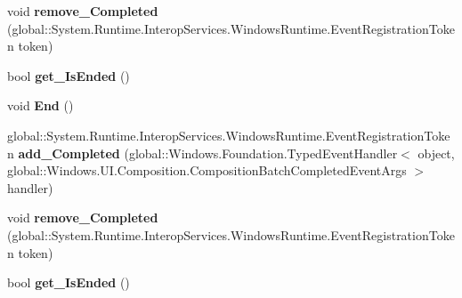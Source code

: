 \begin{DoxyCompactItemize}
\item 
\mbox{\label{interface_windows_1_1_u_i_1_1_composition_1_1_i_composition_scoped_batch_af4baa58c0bffd46f656f3fd7c4b1fdca}} 
void {\bfseries remove\+\_\+\+Completed} (global\+::\+System.\+Runtime.\+Interop\+Services.\+Windows\+Runtime.\+Event\+Registration\+Token token)
\item 
\mbox{\label{interface_windows_1_1_u_i_1_1_composition_1_1_i_composition_scoped_batch_a69a6c393c83900c6a83bce1ebc34c667}} 
bool {\bfseries get\+\_\+\+Is\+Ended} ()
\item 
\mbox{\label{interface_windows_1_1_u_i_1_1_composition_1_1_i_composition_scoped_batch_a6a716664cb94b74043a3dfc0119abd68}} 
void {\bfseries End} ()
\item 
\mbox{\label{interface_windows_1_1_u_i_1_1_composition_1_1_i_composition_scoped_batch_a8e6184255ede7485bdb1fd90fdc9b59c}} 
global\+::\+System.\+Runtime.\+Interop\+Services.\+Windows\+Runtime.\+Event\+Registration\+Token {\bfseries add\+\_\+\+Completed} (global\+::\+Windows.\+Foundation.\+Typed\+Event\+Handler$<$ object, global\+::\+Windows.\+U\+I.\+Composition.\+Composition\+Batch\+Completed\+Event\+Args $>$ handler)
\item 
\mbox{\label{interface_windows_1_1_u_i_1_1_composition_1_1_i_composition_scoped_batch_af4baa58c0bffd46f656f3fd7c4b1fdca}} 
void {\bfseries remove\+\_\+\+Completed} (global\+::\+System.\+Runtime.\+Interop\+Services.\+Windows\+Runtime.\+Event\+Registration\+Token token)
\item 
\mbox{\label{interface_windows_1_1_u_i_1_1_composition_1_1_i_composition_scoped_batch_a69a6c393c83900c6a83bce1ebc34c667}} 
bool {\bfseries get\+\_\+\+Is\+Ended} ()
\item 
\mbox{\label{interface_windows_1_1_u_i_1_1_composition_1_1_i_composition_scoped_batch_a6a716664cb94b74043a3dfc0119abd68}} 

\end{DoxyCompactItemize}
